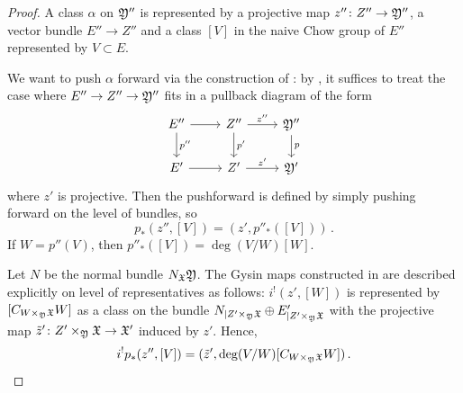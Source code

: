 \documentclass[a4paper,12pt]{article} %
\theoremstyle{definition}
\theoremstyle{plain}%
\newcommand{\jocomment}[1]{}
\begin{document}
\begin{proof}
 A class $\alpha$ on $\frak Y''$ is represented by a projective map $z''\colon Z'' \to \frak Y''$, a vector bundle $E'' \to Z''$ and a class $[V]$
 in the naive Chow group of $E''$ represented  by $V \subset E$. 

We want to push $\alpha$ forward via the construction of \cite[Appendix B]{BaeSchmitt1}: by \cite[Theorem B.17]{BaeSchmitt1}, it suffices to treat the case where $E'' \to Z'' \to \frak Y''$ fits in a pullback diagram of the form 
\begin{equation}\label{diagramskowerapushf}
\begin{tikzcd}
E'' \arrow[r] \arrow[d, "p''"]
&Z'' \arrow[r, "z''"] \arrow[d, "p'"]
&\frak Y'' \arrow[d,"p"] \\
E' \arrow[r] 
&Z' \arrow[r, "z'"]
&\frak Y' 
\end{tikzcd}
\end{equation}
where $z'$ is projective. %
Then the pushforward is defined by simply pushing forward on the level of bundles, so 
$$p_*(z'',[V]) = (z',p''_*([V]))\, .$$
If $W = p''(V)$, then $p''_*([V]) = \deg(V/W)[W]$.  

Let $N$ be the normal bundle $N_{\frak X} \frak Y$.
The Gysin maps constructed in \cite[Section 3.1]{Kresch1999Cycle-groups-fo} are described explicitly on level of representatives as follows: $i^!(z',[W])$ is represented by $[C_{W\times_{\frak Y} \frak X} W]$ as a class on the bundle $N_{\mid Z' \times_{\frak Y} \frak X} \oplus E'_{\mid Z' \times_{\frak Y} \frak X}$ with the projective map $\tilde{z}'\colon Z' \times_{\frak Y} \frak X \to \frak X'$ induced by $z'$. Hence, $$i^!p_*(z'',[V]) =(\tilde{z}', \deg(V/W) [C_{W\times_{\frak Y} \frak X} W])\, .$$



\end{proof}
\end{document}
